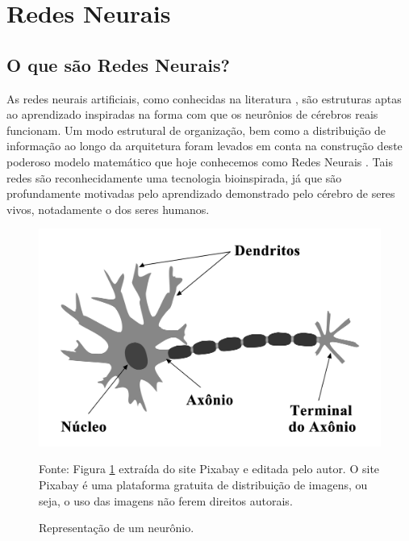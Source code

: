 \section{Redes Neurais}
\subsection{O que são Redes Neurais?}
\label{subsec:oquesaoredesneurais}

As redes neurais artificiais, como conhecidas na literatura \cite{haykin2004comprehensive, haykin2009neural, lecun2015deep}, são estruturas aptas ao aprendizado inspiradas na forma com que os neurônios de cérebros reais funcionam. Um modo estrutural de organização, bem como a distribuição de informação ao longo da arquitetura foram levados em conta na construção deste poderoso modelo matemático que hoje conhecemos como Redes Neurais \cite{haykin2004comprehensive, haykin2009neural, lecun2015deep}. Tais redes são reconhecidamente uma tecnologia bioinspirada, já que são profundamente motivadas pelo aprendizado demonstrado pelo cérebro de seres vivos, notadamente o dos seres humanos. 
\begin{figure}[b]
    \centering
    \caption{Representação de um neurônio.}
    \includegraphics[scale=0.17]{Figuras/Cap2/neuronio.png}
    \begin{center}
    Fonte:
        Figura \ref{fig:neuronio} extraída do site Pixabay \cite{Pixabay} e editada pelo autor. O site Pixabay \cite{Pixabay} é uma plataforma gratuita de distribuição de imagens, ou seja, o uso das imagens não ferem direitos autorais.
    \end{center}
         
        \label{fig:neuronio}
\end{figure}


